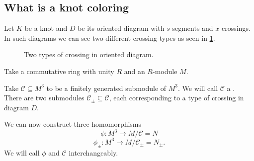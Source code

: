 \subsection{What is a knot coloring}

Let $K$ be a knot and $D$ be its oriented diagram with $s$ segments and $x$ crossings. In such diagrams we can see two different crossing types as seen in \cref{crossing_type}. 
\begin{figure}[h]\centering
  \caption{Two types of crossing in oriented diagram.\label{crossing_type}}
\end{figure}

Take a commutative ring with unity $R$ and an $R$-module $M$.

\begin{definition}
  Take $\mathcal{C}\subseteq M^3$ to be a finitely generated submodule of $M^3$. We will call $\mathcal{C}$ a . There are two submodules $\mathcal{C}_\pm\subseteq \mathcal{C}$, each corresponding to a type of crossing in diagram $D$. 
\end{definition}

We can now construct three homomorphisms
$$\phi:M^3\to M/\mathcal{C}=N$$
$$\phi_\pm:M^3\to M/\mathcal{C}_\pm=N_\pm.$$
We will call $\phi$ and $\mathcal{C}$  interchangeably.



